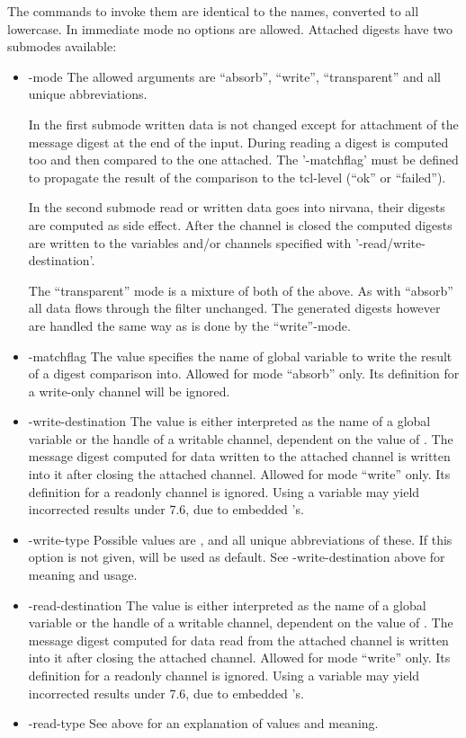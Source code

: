 \documentclass {report}
\begin{document}
The commands to invoke them are identical to the names, converted to
all lowercase. In immediate mode no options are allowed. Attached
digests have two submodes available:

\begin {itemize}
\item [-mode]
	The allowed arguments are ``absorb'', ``write'',
	``transparent'' and all unique abbreviations. 

	In the first submode written data is not changed except for
	attachment of the message digest at the end of the
	input. During reading a digest is computed too and then
	compared to the one attached. The '-matchflag' must be defined
	to propagate the result of the comparison to the tcl-level
	(``ok'' or ``failed'').

	In the second submode read or written data goes into nirvana,
	their digests are computed as side effect. After the channel
	is closed the computed digests are written to the variables
	and/or channels specified with '-read/write-destination'.

	The ``transparent'' mode is a mixture of both of the above. As
	with ``absorb'' all data flows through the filter
	unchanged. The generated digests however are handled the same
	way as is done by the ``write''-mode.


\item [-matchflag]
	The value specifies the name of global variable to write the
	result of a digest comparison into. Allowed for mode
	``absorb'' only. Its definition for a write-only channel will
	be ignored. 

\item [-write-destination]
	The value is either interpreted as the name of a global
	variable or the handle of a writable channel, dependent on the
	value of . The message digest computed for
	data written to the attached channel is written into it after
	closing the attached channel. Allowed for mode ``write''
	only. Its definition for a readonly channel is ignored. Using
	a variable may yield incorrected results under \tcl{} 7.6, due
	to embedded \strterm's. 

\item [-write-type]
	Possible values are ,  and
	all unique abbreviations of these. If this option is not
	given,  will be used as default. See \opt
	{-write-destination} above for meaning and usage.

\item [-read-destination]
	The value is either interpreted as the name of a global
	variable or the handle of a writable channel, dependent on the
	value of . The message digest computed for
	data read from the attached channel is written into it after
	closing the attached channel. Allowed for mode ``write''
	only. Its definition for a readonly channel is ignored. Using
	a variable may yield incorrected results under \tcl{} 7.6, due
	to embedded \strterm's.

\item [-read-type]
	See  above for an explanation of values and meaning.
\end   {itemize}
\end{document}
